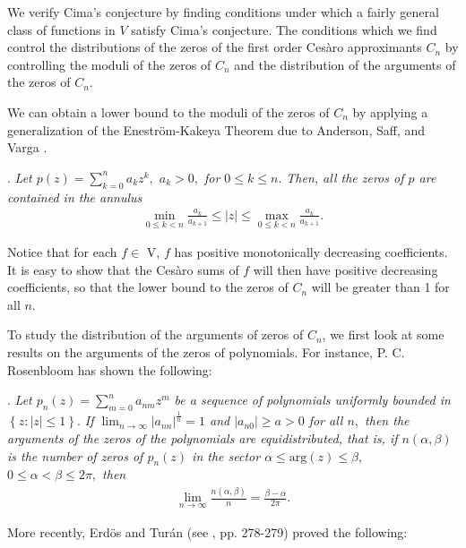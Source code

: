 \documentclass[final]{siamltex}
\begin{document}
We verify Cima's conjecture by finding conditions under which a fairly general class of functions in $V$ satisfy Cima's conjecture.  The conditions which we find control the distributions of the zeros of the first order Ces\`{a}ro approximants $C_n$ by controlling the moduli of the zeros of $C_n$ and the distribution of the arguments of the zeros of $C_n$.  

We can obtain a lower bound to the moduli of the zeros of $C_{n}$ by applying a generalization of the Enestr\"{o}m-Kakeya Theorem  due to Anderson, Saff, and Varga \cite{asv}. 

\vspace{ 4 pt}

. {\em Let $p(z) = \sum_{k=0}^{n} a_{k} z^{k},$ $a_{k} > 0,$ for $0 \leq k \leq n.$ Then, all the zeros of $p$ are contained in the annulus
  \begin{eqnarray*}  \min_{0 \leq k < n} \frac{a_{k}}{a_{k+1}} \leq \left| z \right| \leq \max_{0 \leq k < n} \frac{a_{k}}{a_{k+1}}. 
 \end{eqnarray*} }


 Notice that for each $f \in$ V, $f$ has positive monotonically decreasing coefficients. It is easy to show that the Ces\`{a}ro sums of $f$ will then have positive decreasing coefficients, so that the lower bound to the zeros of $C_{n}$ will be greater than 1 for all $n.$


  To study the distribution of the arguments of zeros of $C_{n}$, we first look at some results on the arguments of the zeros of polynomials. For instance, P. C. Rosenbloom \cite{ros} has shown the following: 

\vspace {4 pt}

. {\em Let $p_{n}(z) = \sum_{m=0}^{n} a_{nm} z^{m}$ be a sequence of polynomials uniformly bounded in $ \left\{ z: |z| \leq 1 \right\}.$ If $\lim_{n \rightarrow \infty} |a_{nn}|^{\frac{1}{n}} = 1$ and $|a_{n0}| \geq a > 0$ for all $n,$ then the arguments of the zeros of the polynomials are equidistributed, that is, if $n( \alpha, \beta)$ is the number of zeros of $p_{n}(z)$ in the sector $\alpha \leq \mbox{arg}(z) \leq \beta,$ $ 0 \leq \alpha < \beta \leq 2 \pi,$ then 
 \begin{eqnarray*} \lim_{n \rightarrow \infty} \frac{ n(\alpha, \beta)}{n} = \frac{ \beta - \alpha}{2 \pi}. 
 \end{eqnarray*}}

More recently, Erd\"{o}s and Tur\'{a}n (see \cite{mil}, pp. 278-279) proved the following:
\end{document}
